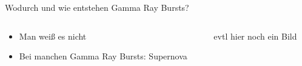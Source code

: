 \begin{frame}{Wodurch und wie entstehen Gamma Ray Bursts?}
  \begin{columns}
 \begin{column}{0.4\textwidth}
  \begin{itemize}
    \item  Man weiß es nicht
    \item  Bei manchen Gamma Ray Bursts: Supernova
  \end{itemize}
\vspace{2em}
\end{column}
\begin{column}{0.6\textwidth}
  evtl hier noch ein Bild

\end{column}
  \end{columns}
\end{frame}




